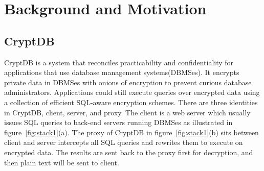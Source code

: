 \section{Background and Motivation}

\subsection{CryptDB}
CryptDB is a system that reconciles practicability and confidentiality for applications that use database management systems(DBMSes). It encrypts private data in DBMSes with onions of encryption to prevent curious database administrators. Applications could still execute queries over encrypted data using a collection of efficient SQL-aware encryption schemes. There are three identities in CryptDB, client, server, and proxy. The client is a web server which usually issues SQL queries to back-end servers running DBMSes as illustrated in figure~\ref{fig:stack1}(a). The proxy of CryptDB in figure~\ref{fig:stack1}(b) sits between client and server intercepts all SQL queries and rewrites them to execute on encrypted data. The results are sent back to the proxy first for decryption, and then plain text will be sent to client. 











